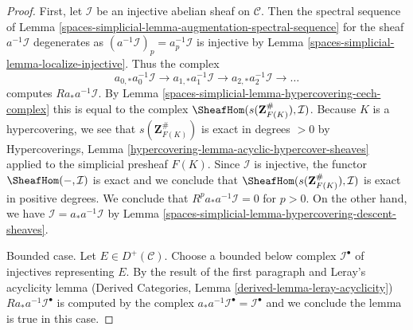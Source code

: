 \begin{proof}
First, let $\mathcal{I}$ be an injective abelian sheaf on $\mathcal{C}$.
Then the spectral sequence of
Lemma \ref{spaces-simplicial-lemma-augmentation-spectral-sequence}
for the sheaf $a^{-1}\mathcal{I}$ degenerates as
$(a^{-1}\mathcal{I})_p = a_p^{-1}\mathcal{I}$
is injective by Lemma \ref{spaces-simplicial-lemma-localize-injective}.
Thus the complex
$$
a_{0, *}a_0^{-1}\mathcal{I} \to
a_{1, *}a_1^{-1}\mathcal{I} \to
a_{2, *}a_2^{-1}\mathcal{I} \to\ldots
$$
computes $Ra_*a^{-1}\mathcal{I}$. By
Lemma \ref{spaces-simplicial-lemma-hypercovering-cech-complex}
this is equal to the complex
$\SheafHom(s(\mathbf{Z}_{F(K)}^\#), \mathcal{I})$.
Because $K$ is a hypercovering, we see that
$s(\mathbf{Z}_{F(K)}^\#)$ is exact in degrees $> 0$ by
Hypercoverings, Lemma \ref{hypercovering-lemma-acyclic-hypercover-sheaves}
applied to the simplicial presheaf $F(K)$.
Since $\mathcal{I}$ is injective, the functor $\SheafHom(-, \mathcal{I})$
is exact and we conclude that
$\SheafHom(s(\mathbf{Z}_{F(K)}^\#), \mathcal{I})$
is exact in positive degrees. We conclude that
$R^pa_*a^{-1}\mathcal{I} = 0$ for $p > 0$.
On the other hand, we have $\mathcal{I} = a_*a^{-1}\mathcal{I}$
by Lemma \ref{spaces-simplicial-lemma-hypercovering-descent-sheaves}.

\medskip\noindent
Bounded case. Let $E \in D^+(\mathcal{C})$.
Choose a bounded below complex $\mathcal{I}^\bullet$ of injectives
representing $E$. By the result of the first paragraph and
Leray's acyclicity lemma
(Derived Categories, Lemma \ref{derived-lemma-leray-acyclicity})
$Ra_*a^{-1}\mathcal{I}^\bullet$
is computed by the complex
$a_*a^{-1}\mathcal{I}^\bullet = \mathcal{I}^\bullet$
and we conclude the lemma is true in this case.


\end{proof}
